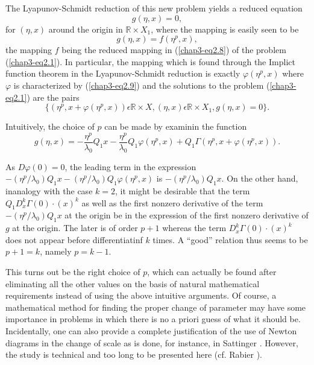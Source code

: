The Lyapunov-Schmidt reduction of this new problem yields a reduced
equation
$$
g(\eta, x) = 0,
$$
for $(\eta, x)$ around the origin in $\mathbb{R} \times X_{1}$, where
the mapping is easily seen to be
$$
g(\eta, x) = f(\eta^{p}, x),
$$
the mapping $f$ being the reduced mapping in (\ref{chap3-eq2.8}) of the
problem (\ref{chap3-eq2.1}). In particular, the mapping which is found
through the Implict function theorem in the Lyapunov-Schmidt reduction
is exactly $\varphi(\eta^{p}, x)$ where $\varphi$ is characterized by
(\ref{chap3-eq2.9}) and the solutions to the problem
(\ref{chap3-eq2.1}) are the pairs
\begin{equation*}
\{(\eta^{p}, x + \varphi(\eta^{p}, x)) \epsilon \mathbb{R} \times X,
(\eta, x) \epsilon \mathbb{R} \times X_{1}, g(\eta, x) = 0 \}.\tag{2.17}\label{chap3-eq2.17}
\end{equation*}

Intuitively, the choice of $p$ can be made by examinin the function
\begin{equation*}
g(\eta, x) = -\frac{\eta^{p}}{\lambda_{0}} Q_{1}x -
\frac{\eta^{p}}{\lambda_{0}} Q_{1}\varphi (\eta^{p}, x) +
Q_{1}\Gamma(\eta^{p}, x + \varphi(\eta^{p}, x)).\tag{2.18}\label{chap3-eq2.18}
\end{equation*}

As $D\varphi(0) = 0$, the leading term in the expression
$-(\eta^{p} / \lambda_{0})Q_{1} x - (\eta^{p}/\lambda_{0})
Q_{1}\varphi(\eta^{p}, x)$ is $-(\eta^{p}/\lambda_{0})Q_{1}x$. On the
other hand, in\pageoriginale analogy with the case $k = 2$, it might
be desirable that the term $Q_{1}D_{x}^{k}\Gamma(0) \cdot (x)^{k}$ as
well as the first nonzero derivative of the term $- (\eta^{p}/
\lambda_{0})Q_{1}x$ at the origin be in the expression of the first
nonzero derivative of $g$ at the origin. The later is of order $p + 1$
whereas the term $D_{x}^{k}\Gamma(0) \cdot (x)^{k}$ does not appear
before differentiatinf $k$ times. A ``good'' relation thus seems to be $p
+ 1 = k$, namely $p = k - 1$.

This turns out be the right choice of $p$, which can actually be found
after eliminating all the other values on the basis of natural
mathematical requirements instead of using the above intuitive
arguments. Of course, a mathematical method for finding the proper
change of parameter may have some importance in problems in which
there is no a priori guess of what it should be. Incidentally, one can
also provide a complete justification of the use of Newton diagrams in
the change of scale as is done, for instance, in Sattinger
\cite{34}. However, the study is technical and too long to be presented
here (cf. Rabier \cite{31}).

